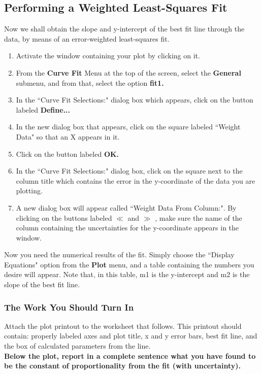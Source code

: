 \subsection{Performing a Weighted Least-Squares Fit}
Now we shall obtain the slope and y-intercept of the best fit line through the data, by means of an error-weighted least-squares fit.
\noindent
\begin{enumerate}
\item Activate the window containing your plot by clicking on it.
\item From the {\bf Curve Fit} Menu at the top of the screen, select the {\bf General}
submenu, and from that, select the option {\bf fit1.}
\item In the ``Curve Fit Selections:" dialog box which appears, click on the button
labeled {\bf Define...}
\item In the new dialog box that appears, click on the square labeled ``Weight Data"
so that an X appears in it.
\item Click on the button labeled {\bf OK.}
\item In the ``Curve Fit Selections:" dialog box, click on the square next to the
column title which contains the error in the
y-coordinate of the data you are
plotting.
\item A new dialog box will appear called ``Weight Data From Column:". By clicking on
the buttons labeled $\ll$ and $\gg$ , make sure the name of the
column containing the uncertainties for the y-coordinate appears in
the window.
\end{enumerate}
\indent

Now you need the numerical results of the fit. Simply choose the
``Display Equations" option from the {\bf Plot} menu, and a table
containing the numbers you desire will appear. Note that, in this
table, m1 is the y-intercept and m2 is the slope of the best fit line.

\subsubsection{The Work You Should Turn In}

Attach the plot printout to the worksheet that follows. This printout 
should contain: properly labeled axes and plot title, x and y error bars, best fit line, and the box of calculated parameters from the line.\\
{\bf Below the plot, report in a complete
sentence what you have found to be the constant of proportionality from the fit
(with uncertainty).} \\



